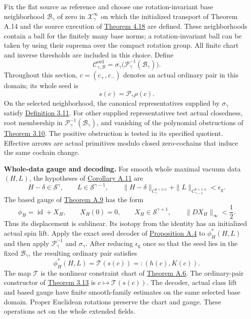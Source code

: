 \documentclass[
  english,
  11pt,
  reqno]{amsart}
\makeatletter
\newcommand{\paperleadspace}{%
  \par\if@nobreak\else
    \addpenalty{\@secpenalty}\addvspace{.5\baselineskip}%
  \fi}
\newcommand{\paperleadin}[1]{%
  \ifvmode\paperleadspace\fi
  \textbf{#1}}
\makeatother
\begin{document}
Fix the flat source as reference and choose one rotation-invariant base
neighborhood \(\mathcal B_\gamma\) of zero in
\(\mathcal X^\infty_\gamma\) on which the initialized transport of
Theorem A.14 and the source execution of
\hyperref[thm:online-ordinary-negative-response-initial-source]{Theorem
4.18} are defined. These neighborhoods contain a ball for the finitely
many base norms; a rotation-invariant ball can be taken by using their
suprema over the compact rotation group. All finite chart and inverse
thresholds are included in this choice. Define%
 \[
\mathscr C^{\mathrm{ord}}_{\gamma,\mathcal B}
=
\sigma_\gamma\bigl(\mathscr P_\gamma^{-1}
(\mathcal B_\gamma)\bigr).
\] Throughout this section, \(c=(c_+,c_-)\) denotes an actual ordinary
pair in this domain; its whole seed is%
 \[
s(c)=\mathscr P_\gamma\rho(c).
\] On the selected neighborhood, the canonical representatives supplied
by \(\sigma_\gamma\) satisfy
\hyperref[def:online-effective-ordinary-cochain-domain]{Definition
3.11}. For other supplied representatives test actual closedness, root
membership in \(\mathscr P_\gamma^{-1}(\mathcal B_\gamma)\), and
vanishing of the polynomial obstructions of
\hyperref[thm:online-actual-cochain-obstruction-test]{Theorem 3.10}. The
positive obstruction is tested in its specified quotient. Effective
arrows are actual primitives modulo closed zero-cochains that induce the
same cochain change.

\paperleadin{Whole-data gauge and decoding.} For smooth whole maximal vacuum
data \((H,L)\), the hypotheses of
\hyperref[cor:online-gauge-whole-data-decoding]{Corollary A.11} are%
 \[
H-\delta\in\mathscr S^\gamma,\qquad
L\in\mathscr S^{\gamma-1},\qquad
\|H-\delta\|_{C^{k+2,\alpha}_\gamma}
+\|L\|_{C^{k+1,\alpha}_{\gamma-1}}<\epsilon_{\mathrm g}.
\] The based gauge of
\hyperref[thm:online-gauge-based-normalization]{Theorem A.9} has the
form%
 \[
\phi_H=\operatorname{id}+X_H,\qquad
X_H(0)=0,\qquad
X_H\in\mathscr S^{\gamma+1},\qquad
\|DX_H\|_\infty<\frac12.
\] Thus its displacement is sublinear. Its isotopy from the identity has
an initialized actual spin lift. Apply the exact seed decoder of
\hyperref[prop:online-chart-exact-ambient-decoder]{Proposition A.4} to
\(\phi_H^*(H,L)\) and then apply \(\mathscr P_\gamma^{-1}\) and
\(\sigma_\gamma\). After reducing \(\epsilon_{\mathrm g}\) once so that
the seed lies in the fixed \(\mathcal B_\gamma\), the resulting ordinary
pair satisfies%
 \[
\phi_H^*(H,L)=\mathcal T(s(c))
=:(h(c),K(c)).
\] The map \(\mathcal T\) is the nonlinear constraint chart of
\hyperref[thm:online-chart-base-constraint-bijection]{Theorem A.6}. The
ordinary-pair constructor of
\hyperref[thm:online-ordinary-pair-data-bijection]{Theorem 3.13} is
\(c\mapsto\mathcal T(s(c))\). The decoder, actual class lift and based
gauge have finite smooth-family estimates on the same selected base
domain. Proper Euclidean rotations preserve the chart and gauge. These
operations act on the whole extended fields.
\end{document}
